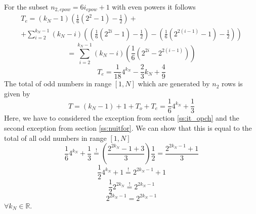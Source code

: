 \documentclass{aomart}
\theoremstyle{definition}
\begin{document}
For the subset $n_{2,epow} = 6i_{epow} + 1$ with even powers it follows 
\begin{multline*} T_{e} =  \left( k_{N} - 1 \right) \left( \frac{1}{6} \left( 2^{2} - 1 \right) - \frac{1}{2} \right) + \\ 
+ \sum_{i=2}^{k_{N}-1} \left( k_{N}-i \right) \left( \left( \frac{1}{6} \left(2^{2i} - 1 \right) - \frac{1}{2} \right) - \left( \frac{1}{6} \left( 2^{2(i-1)} - 1 \right) - \frac{1}{2} \right) \right) \end{multline*}
\[ = \sum_{i=2}^{k_{N}-1} \left( k_{N} - i \right) \left( \frac{1}{6} \left( 2^{2i} - 2^{2(i-1)} \right) \right) \]
\begin{equation}\label{eq:toteven}
	T_{e} = \frac{1}{18} 4^{k_{N}} - \frac{2}{3} k_{N} + \frac{4}{9}
\end{equation}
The total of odd numbers in range $[1,N]$ which are generated by $n_{2}$ rows is given by
\begin{equation}\label{eq:totnumb}
	T = \left( k_{N} - 1 \right) + 1 + T_{o} + T_{e} = \frac{1}{6} 4^{k_{N}} + \frac{1}{3}
\end{equation}
Here, we have to considered the exception from section \ref{ss:it_opch} and the second exception from section \ref{ss:nuitfor}. We can show that this is equal to the total of all odd numbers in range $[1,N]$
\[ \frac{1}{6} 4^{k_{N}} + \frac{1}{3} \stackrel{!}{=} \left( \frac{2^{2k_{N}} - 1 + 3 }{3} \right) \frac{1}{2} =\frac{2^{2k_{N}-1}+1}{3} \]
\[ \frac{1}{2} 4^{k_{N}} + 1 \stackrel{!}{=} 2^{2k_{N}-1} + 1 \]
\[ \frac{1}{2} 2^{2k_{N}} \stackrel{!}{=} 2^{2k_{N}-1} \]
\[ 2^{2k_{N}-1} = 2^{2k_{N}-1} \]
$\forall k_{N} \in \mathbb{R}$.
\end{document}
